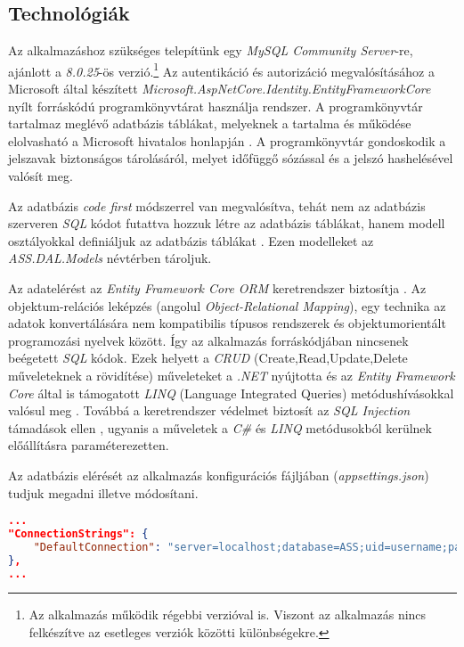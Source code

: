 \subsection{Technológiák}
Az alkalmazáshoz szükséges telepítünk egy \emph{MySQL Community Server}-re, ajánlott a \emph{8.0.25}-ös verzió.\footnote{Az alkalmazás működik régebbi verzióval is. Viszont az alkalmazás nincs felkészítve az esetleges verziók közötti különbségekre.} Az autentikáció és autorizáció megvalósításához a Microsoft által készített \emph{Microsoft.AspNetCore.Identity.EntityFrameworkCore} nyílt forráskódú programkönyvtárat használja rendszer. A programkönyvtár tartalmaz meglévő adatbázis táblákat, melyeknek a tartalma és működése elolvasható a Microsoft hivatalos honlapján \cite{Identity}. A programkönyvtár gondoskodik a jelszavak biztonságos tárolásáról, melyet időfüggő sózással és a jelszó hashelésével valósít meg.

Az adatbázis \emph{code first} módszerrel van megvalósítva, tehát nem az adatbázis szerveren \emph{SQL} kódot futattva hozzuk létre az adatbázis táblákat, hanem modell osztályokkal definiáljuk az adatbázis táblákat \cite{CodeFirst}. Ezen modelleket az \emph{ASS.DAL.Models} névtérben tároljuk.

Az adatelérést az \emph{Entity Framework Core ORM} keretrendszer biztosítja \cite{EFCore}. Az objektum-relációs leképzés (angolul \emph{Object-Relational Mapping}), egy technika az adatok konvertálására nem kompatibilis típusos rendszerek és objektumorientált programozási nyelvek között. Így az alkalmazás forráskódjában nincsenek beégetett \emph{SQL} kódok. Ezek helyett a \emph{CRUD} (Create,Read,Update,Delete műveleteknek a rövidítése) műveleteket a \emph{.NET} nyújtotta és az \emph{Entity Framework Core} által is támogatott \emph{LINQ} (Language Integrated Queries) metódushívásokkal valósul meg \cite{LINQ}. Továbbá a keretrendszer védelmet biztosít az \emph{SQL Injection} támadások ellen \cite{SQLInjection}, ugyanis a műveletek a \emph{C\#} és \emph{LINQ} metódusokból kerülnek előállításra paraméterezetten.

Az adatbázis elérését az alkalmazás konfigurációs fájljában (\emph{appsettings.json}) tudjuk megadni illetve módosítani.
\begin{lstlisting}[language=json]
...
"ConnectionStrings": {
	"DefaultConnection": "server=localhost;database=ASS;uid=username;password=fooBarraBoof"
},
...
\end{lstlisting}
